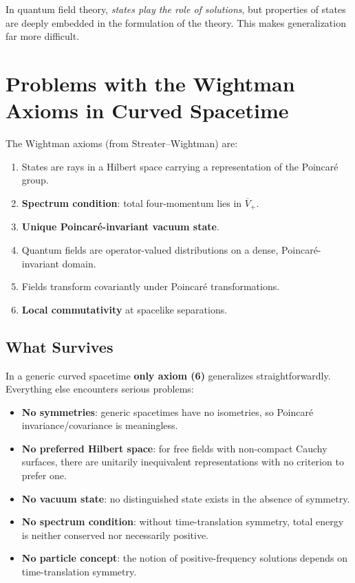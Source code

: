 \documentclass[11pt,a4paper]{article}
\begin{document}
In quantum field theory, \emph{states play the role of solutions}, but
properties of states are deeply embedded in the formulation of the theory.
This makes generalization far more difficult.

\section{Problems with the Wightman Axioms in Curved Spacetime}

The Wightman axioms (from Streater--Wightman) are:
\begin{enumerate}
  \item States are rays in a Hilbert space carrying a representation of
        the Poincar\'e group.
  \item \textbf{Spectrum condition}: total four-momentum lies in
        $\overline{V}_+$.
  \item \textbf{Unique Poincar\'e-invariant vacuum state}.
  \item Quantum fields are operator-valued distributions on a dense,
        Poincar\'e-invariant domain.
  \item Fields transform covariantly under Poincar\'e transformations.
  \item \textbf{Local commutativity} at spacelike separations.
\end{enumerate}

\subsection{What Survives}

In a generic curved spacetime \textbf{only axiom (6)} generalizes
straightforwardly. Everything else encounters serious problems:
\begin{itemize}[nosep]
  \item \textbf{No symmetries}: generic spacetimes have no isometries,
        so Poincar\'e invariance/covariance is meaningless.
  \item \textbf{No preferred Hilbert space}: for free fields with
        non-compact Cauchy surfaces, there are unitarily inequivalent
        representations with no criterion to prefer one.
  \item \textbf{No vacuum state}: no distinguished state exists in
        the absence of symmetry.
  \item \textbf{No spectrum condition}: without time-translation symmetry,
        total energy is neither conserved nor necessarily positive.
  \item \textbf{No particle concept}: the notion of positive-frequency
        solutions depends on time-translation symmetry.
\end{itemize}
\end{document}
